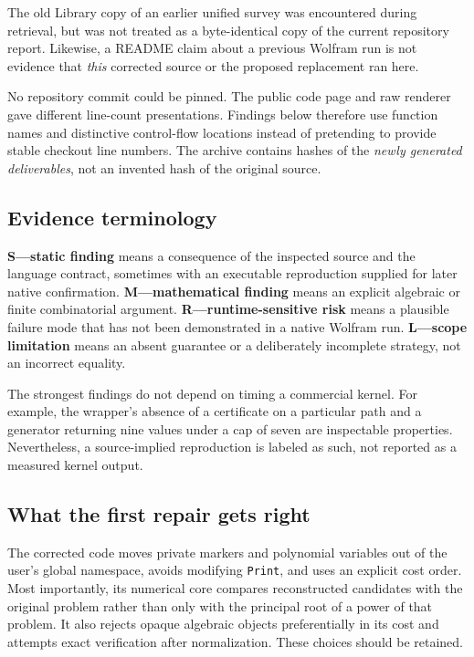\documentclass[11pt,letterpaper]{article}
\newcommand{\code}[1]{\texttt{#1}}
\theoremstyle{definition}
\begin{document}
The old Library copy of an earlier unified survey was encountered during retrieval, but was not treated as a byte-identical copy of the current repository report. Likewise, a README claim about a previous Wolfram run is not evidence that \emph{this} corrected source or the proposed replacement ran here.

No repository commit could be pinned. The public code page and raw renderer gave different line-count presentations. Findings below therefore use function names and distinctive control-flow locations instead of pretending to provide stable checkout line numbers. The archive contains hashes of the \emph{newly generated deliverables}, not an invented hash of the original source.

\subsection{Evidence terminology}

\textbf{S---static finding} means a consequence of the inspected source and the language contract, sometimes with an executable reproduction supplied for later native confirmation. \textbf{M---mathematical finding} means an explicit algebraic or finite combinatorial argument. \textbf{R---runtime-sensitive risk} means a plausible failure mode that has not been demonstrated in a native Wolfram run. \textbf{L---scope limitation} means an absent guarantee or a deliberately incomplete strategy, not an incorrect equality.

The strongest findings do not depend on timing a commercial kernel. For example, the wrapper's absence of a certificate on a particular path and a generator returning nine values under a cap of seven are inspectable properties. Nevertheless, a source-implied reproduction is labeled as such, not reported as a measured kernel output.

\subsection{What the first repair gets right}

The corrected code moves private markers and polynomial variables out of the user's global namespace, avoids modifying \code{Print}, and uses an explicit cost order. Most importantly, its numerical core compares reconstructed candidates with the original problem rather than only with the principal root of a power of that problem. It also rejects opaque algebraic objects preferentially in its cost and attempts exact verification after normalization. These choices should be retained.\cite{fixed}
\end{document}
